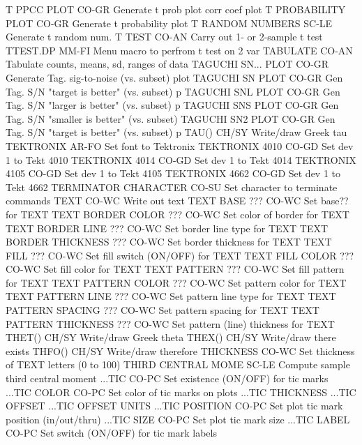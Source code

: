T PPCC PLOT                 CO-GR Generate t prob plot corr coef plot
T PROBABILITY PLOT          CO-GR Generate t probability plot
T RANDOM NUMBERS            SC-LE Generate t random num.
T TEST                      CO-AN Carry out 1- or 2-sample t test
TTEST.DP                    MM-FI Menu macro to perfrom t test on 2 var
TABULATE                    CO-AN Tabulate counts, means, sd, ranges of data
TAGUCHI SN... PLOT          CO-GR Generate Tag. sig-to-noise (vs. subset) plot
TAGUCHI SN PLOT             CO-GR Gen Tag. S/N "target is better" (vs. subset) p
TAGUCHI SNL PLOT            CO-GR Gen Tag. S/N "larger is better" (vs. subset) p
TAGUCHI SNS PLOT            CO-GR Gen Tag. S/N "smaller is better" (vs. subset)
TAGUCHI SN2 PLOT            CO-GR Gen Tag. S/N "target is better" (vs. subset) p
TAU()                       CH/SY Write/draw Greek tau
TEKTRONIX                   AR-FO Set font to Tektronix
TEKTRONIX 4010              CO-GD Set dev 1 to Tekt 4010
TEKTRONIX 4014              CO-GD Set dev 1 to Tekt 4014
TEKTRONIX 4105              CO-GD Set dev 1 to Tekt 4105
TEKTRONIX 4662              CO-GD Set dev 1 to Tekt 4662
TERMINATOR CHARACTER        CO-SU Set character to terminate commands
TEXT                        CO-WC Write out text
TEXT BASE              ???  CO-WC Set base?? for TEXT
TEXT BORDER COLOR      ???  CO-WC Set color of border for TEXT
TEXT BORDER LINE       ???  CO-WC Set border line type for TEXT
TEXT BORDER THICKNESS  ???  CO-WC Set border thickness for TEXT
TEXT FILL              ???  CO-WC Set fill switch (ON/OFF) for TEXT
TEXT FILL COLOR        ???  CO-WC Set fill color for TEXT
TEXT PATTERN           ???  CO-WC Set fill pattern for TEXT
TEXT PATTERN COLOR     ???  CO-WC Set pattern color for TEXT
TEXT PATTERN LINE      ???  CO-WC Set pattern line type for TEXT
TEXT PATTERN SPACING   ???  CO-WC Set pattern spacing for TEXT
TEXT PATTERN THICKNESS ???  CO-WC Set pattern (line) thickness for TEXT
THET()                      CH/SY Write/draw Greek theta
THEX()                      CH/SY Write/draw there exists
THFO()                      CH/SY Write/draw therefore
THICKNESS                   CO-WC Set thickness of TEXT letters (0 to 100)
THIRD CENTRAL MOME          SC-LE Compute sample third central moment
...TIC                      CO-PC Set existence (ON/OFF) for tic marks
...TIC COLOR                CO-PC Set color of tic marks on plots
...TIC THICKNESS
...TIC OFFSET
...TIC OFFSET UNITS
...TIC POSITION             CO-PC Set plot tic mark position (in/out/thru)
...TIC SIZE                 CO-PC Set plot tic mark size
...TIC LABEL                CO-PC Set switch (ON/OFF) for tic mark labels
